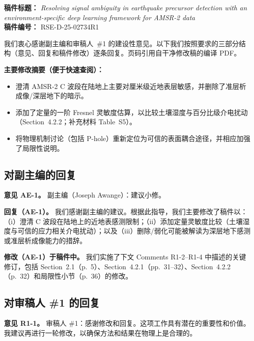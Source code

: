 \documentclass[11pt]{article}
\newcommand{\revcomment}[1]{\begingroup\color{commentcolor}#1\endgroup}
\newcommand{\revresponse}[1]{\begingroup\color{responsecolor}#1\endgroup}
\newcommand{\revchange}[1]{\begingroup\color{changecolor}#1\endgroup}
\begin{document}
\textbf{稿件标题：} \textit{Resolving signal ambiguity in earthquake precursor detection with an environment-specific deep learning framework for AMSR-2 data}\\
\textbf{稿件编号：} RSE-D-25-02734R1

\medskip

我们衷心感谢副主编和审稿人~\#1 的建设性意见。以下我们按照要求的三部分结构（意见、回复和稿件修改）逐条回复。页码引用自干净修改稿的编译 PDF。

\medskip

\noindent\textbf{主要修改摘要（便于快速查阅）：}
\begin{itemize}[leftmargin=*, nosep]
  \item 澄清 AMSR-2 C 波段在陆地上主要对厘米级近地表层敏感，并删除了准层析成像/深层地下的暗示。
  \item 添加了定量的一阶 Fresnel 灵敏度估算，以比较土壤湿度与百分比级介电扰动（Section~4.2.2；补充材料 Table~S5）。
  \item 将物理机制讨论（包括 P-hole）重新定位为可信的表面耦合途径，并相应加强了局限性说明。
\end{itemize}

\bigskip

\subsection*{对副主编的回复}

\revcomment{%
\textbf{意见 AE-1。}
副主编（Joseph Awange）：建议小修。
}

\revresponse{%
\textbf{回复（AE-1）。}
我们感谢副主编的建议。根据此指导，我们主要修改了稿件以：（i）澄清 C 波段在陆地上的近地表感测限制；（ii）添加定量灵敏度比较（土壤湿度与可信的应力相关介电扰动）；以及（iii）删除/弱化可能被解读为深层地下感测或准层析成像能力的措辞。
}

\revchange{%
\textbf{修改（AE-1）于稿件中。}
我们实施了下文 Comments R1-2--R1-4 中描述的关键修订，包括 Section~2.1（p.~5）、Section~4.2.1（pp.~31--32）、Section~4.2.2（p.~32）和局限性小节（p.~36）的修改。
}

\bigskip

\subsection*{对审稿人 \#1 的回复}

\revcomment{%
\textbf{意见 R1-1。}
审稿人 \#1：感谢修改和回复。这项工作具有潜在的重要性和价值。我建议再进行一轮修改，以确保方法和结果在物理上是合理的。
}
\end{document}
